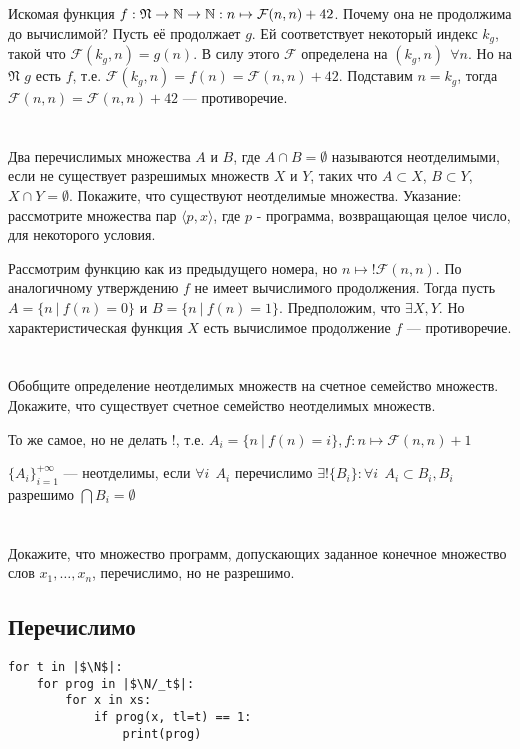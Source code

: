 Искомая функция \(f : \mathfrak{N} \to \mathbb{N} \to \mathbb{N} : n \mapsto \mathcal{F}(n, n) + 42\). Почему она не продолжима до вычислимой? Пусть её продолжает \(g\). Ей соответствует некоторый индекс \(k_g\), такой что \(\mathcal{F}(k_g, n) = g(n)\). В силу этого \(\mathcal{F}\) определена на \((k_g, n) \ \ \forall n\). Но на \(\mathfrak{N}\) \(g\) есть \(f\), т.е. \(\mathcal{F}(k_g, n) = f(n) = \mathcal{F}(n, n) + 42\). Подставим \(n = k_g\), тогда \(\mathcal{F}(n, n) = \mathcal{F}(n, n) + 42\) --- противоречие.

\section{}
Два перечислимых множества $A$ и $B$, где $A \cap B = \emptyset$ называются неотделимыми, если не существует разрешимых множеств $X$ и $Y$, таких что $A \subset X$, $B \subset Y$, $X \cap Y = \emptyset$. Покажите, что существуют неотделимые множества. Указание: рассмотрите множества пар $\langle p, x\rangle$, где $p$ - программа, возвращающая целое число, для некоторого условия.

Рассмотрим функцию как из предыдущего номера, но \(n \mapsto !\mathcal{F}(n, n)\). По аналогичному утверждению \(f\) не имеет вычислимого продолжения. Тогда пусть \(A = \{n\ |\ f(n) = 0\}\) и \(B = \{n\ |\ f(n) = 1\}\). Предположим, что \(\exists X, Y\). Но характеристическая функция \(X\) есть вычислимое продолжение \(f\) --- противоречие.

\section{}
Обобщите определение неотделимых множеств на счетное семейство множеств. Докажите, что существует счетное семейство неотделимых множеств.

То же самое, но не делать \(!\), т.е. \(A_i = \{n\ |\ f(n) = i\}, f : n \mapsto \mathcal{F}(n, n) + 1\)

\(\{A_i\}_{i = 1}^{+\infty}\) --- неотделимы, если \(\forall i \ \ A_i\) перечислимо \(\exists ! \{B_i\} : \forall i \ \ A_i \subset B_i, B_i\) разрешимо \(\bigcap B_i = \emptyset\)

\section{}
Докажите, что множество программ, допускающих заданное конечное множество слов $x_1, \ldots, x_n$, перечислимо, но не разрешимо.

\subsection{Перечислимо}
\begin{verbatim}
for t in |$\N$|:
    for prog in |$\N/_t$|:
        for x in xs:
            if prog(x, tl=t) == 1:
                print(prog)
\end{verbatim}

